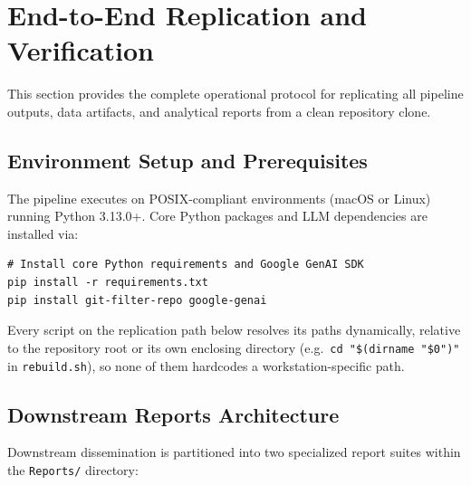 \section{End-to-End Replication and Verification}
\label{sec:replication}

This section provides the complete operational protocol for replicating all pipeline outputs, data artifacts, and analytical reports from a clean repository clone.

\subsection{Environment Setup and Prerequisites}
\label{sec:replication_env}

The pipeline executes on POSIX-compliant environments (macOS or Linux) running Python 3.13.0+. Core Python packages and LLM dependencies are installed via:
\begin{verbatim}
# Install core Python requirements and Google GenAI SDK
pip install -r requirements.txt
pip install git-filter-repo google-genai
\end{verbatim}

\noindent Every script on the replication path below resolves its paths dynamically, relative to the repository root or its own enclosing directory (e.g.\ \texttt{cd "\$(dirname "\$0")"} in \nolinkurl{rebuild.sh}), so none of them hardcodes a workstation-specific path.

\subsection{Downstream Reports Architecture}
\label{sec:reports_architecture}

Downstream dissemination is partitioned into two specialized report suites within the \nolinkurl{Reports/} directory:

